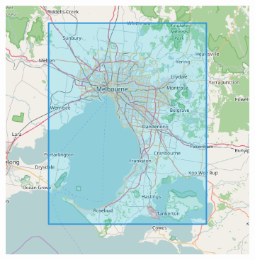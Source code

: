 \begin{figure}[htbp]
\begin{subfigure}[htbp]{0.3\textwidth}
	\end{subfigure}
	\quad
	\begin{subfigure}[htbp]{0.3\textwidth}
		\centering
		\includegraphics[width=1\linewidth]{figures/melbourne_markers.png}
		\caption{}
		\label{subfig:melbourne_markers}
	\end{subfigure}
	

\end{figure}
